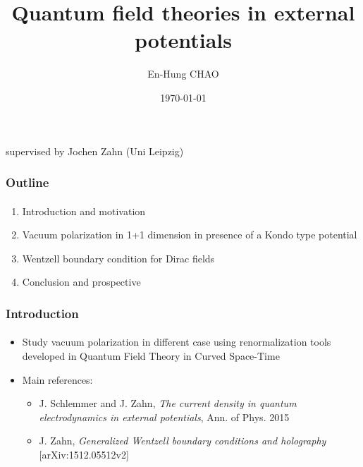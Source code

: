 \documentclass[french]{beamer}
\title{Quantum field theories in external potentials}
\author{En-Hung CHAO}
\institute{Ecole Polytechnique \& Uni Leipzig}
\date{\today}
\begin{document}

\begin{frame}
\titlepage%
\centerline{supervised by Jochen Zahn (Uni Leipzig)}
\end{frame}
\begin{frame}
\frametitle{Outline}
\framesubtitle{}
\begin{enumerate}
 \item Introduction and motivation
 \item Vacuum polarization in 1+1 dimension in presence of a Kondo type potential
 \item Wentzell boundary condition for Dirac fields
 \item Conclusion and prospective
\end{enumerate}

\end{frame}
\begin{frame}
\frametitle{Introduction}
\framesubtitle{}

\begin{itemize}

\item Study vacuum polarization in different case using renormalization tools developed in Quantum Field Theory in Curved Space-Time

\item Main references: 
\begin{itemize}
\item J. Schlemmer and J. Zahn, \textit{The current density in quantum electrodynamics in external potentials}, Ann. of Phys. 2015\\

\item J. Zahn, \textit{Generalized Wentzell boundary conditions and holography} [arXiv:1512.05512v2]
\end{itemize}

\end{itemize}

\end{frame}
\end{document}
